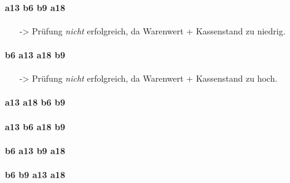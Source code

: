 \begin{enumerate}[a)]
\begin{solution}
		\paragraph{\color{solutioncolor} a13 b6 b9 a18}
		\begin{itemize}
			\ware
			\postWare
			\preMoney
			\money
			\item[->] Prüfung \emph{nicht} erfolgreich, da Warenwert + Kassenstand zu niedrig.
		\end{itemize}

		\paragraph{\color{solutioncolor} b6 a13 a18 b9}
		\begin{itemize}
			\preWare
			\ware
			\money
			\postMoney
			\item[->] Prüfung \emph{nicht} erfolgreich, da Warenwert + Kassenstand zu hoch.
		\end{itemize}

		\paragraph{\color{solutioncolor} a13 a18 b6 b9}
		\begin{itemize}
			\ware
			\money
			\postWare
			\postMoney
			\postSuccess
		\end{itemize}

		\paragraph{\color{solutioncolor} a13 b6 a18 b9}
		\begin{itemize}
			\ware
			\postWare
			\money
			\postMoney
			\postSuccess
		\end{itemize}

		\paragraph{\color{solutioncolor} b6 a13 b9 a18}
		\begin{itemize}
			\preWare
			\ware
			\preMoney
			\money
			\preSuccess
		\end{itemize}

		\paragraph{\color{solutioncolor} b6 b9 a13 a18}
		\begin{itemize}
			\preWare
			\preMoney
			\ware
			\money
			\preSuccess
		\end{itemize}


\end{solution}
\end{enumerate}
